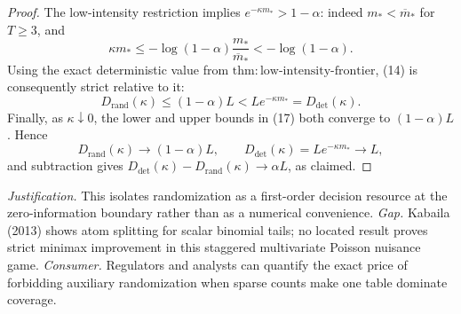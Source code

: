 \documentclass{article}
\begin{document}
\begin{proof}
The low-intensity restriction implies
\(e^{-\kappa m_*}>1-\alpha\): indeed \(m_*<\overline m_*\) for \(T\ge3\), and
\[
 \kappa m_*\le-\log(1-\alpha)\frac{m_*}{\overline m_*}
 <-\log(1-\alpha).
\]
Using the exact deterministic value from \(\mathrm{thm{:}low\text{-}intensity\text{-}frontier}\), (14) is consequently strict relative to it:
\[
 D_{\mathrm{rand}}(\kappa)\le(1-\alpha)L
 <Le^{-\kappa m_*}=D_{\mathrm{det}}(\kappa).
\]
Finally, as \(\kappa\downarrow0\), the lower and upper bounds in (17) both converge to \((1-\alpha)L\).  Hence
\[
 D_{\mathrm{rand}}(\kappa)\longrightarrow(1-\alpha)L,
 \qquad
 D_{\mathrm{det}}(\kappa)=Le^{-\kappa m_*}\longrightarrow L,
\]
and subtraction gives
\(D_{\mathrm{det}}(\kappa)-D_{\mathrm{rand}}(\kappa)\to\alpha L\), as claimed.
\end{proof}
\par\smallskip\noindent \textit{Justification.} This isolates randomization as a first-order decision resource at the zero-information boundary rather than as a numerical convenience. \textit{Gap.} Kabaila (2013) shows atom splitting for scalar binomial tails; no located result proves strict minimax improvement in this staggered multivariate Poisson nuisance game. \textit{Consumer.} Regulators and analysts can quantify the exact price of forbidding auxiliary randomization when sparse counts make one table dominate coverage.
\end{document}
